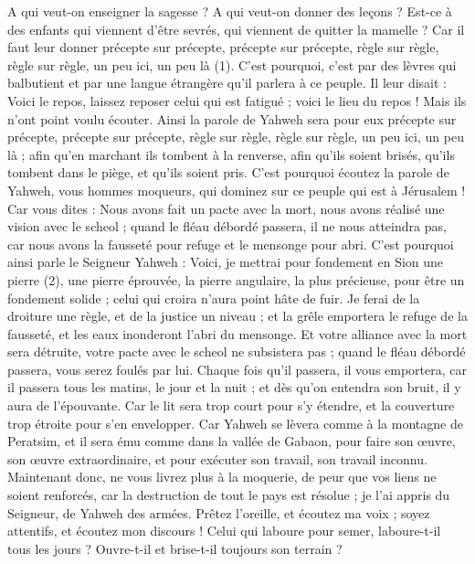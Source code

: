 \begin{multicols}{2}
A qui veut-on enseigner la sagesse ? A qui veut-on donner des leçons ? Est-ce à des enfants qui viennent d’être sevrés, qui viennent de quitter la mamelle ?
Car il faut leur donner précepte sur précepte, précepte sur précepte, règle sur règle, règle sur règle, un peu ici, un peu là (1).
C'est pourquoi, c’est par des lèvres qui balbutient et par une langue étrangère qu’il parlera à ce peuple.
Il leur disait : Voici le repos, laissez reposer celui qui est fatigué ; voici le lieu du repos ! Mais ils n'ont point voulu écouter.
Ainsi la parole de Yahweh sera pour eux précepte sur précepte, précepte sur précepte, règle sur règle, règle sur règle, un peu ici, un peu là ; afin qu’en marchant ils tombent à la renverse, afin qu'ils soient brisés, qu'ils tombent dans le piège, et qu'ils soient pris.
C'est pourquoi écoutez la parole de Yahweh, vous hommes moqueurs, qui dominez sur ce peuple qui est à Jérusalem !
Car vous dites : Nous avons fait un pacte avec la mort, nous avons réalisé une vision avec le scheol ; quand le fléau débordé passera, il ne nous atteindra pas, car nous avons la fausseté pour refuge et le mensonge pour abri.
C'est pourquoi ainsi parle le Seigneur Yahweh : Voici, je mettrai pour fondement en Sion une pierre (2), une pierre éprouvée, la pierre angulaire, la plus précieuse, pour être un fondement solide ; celui qui croira n’aura point hâte de fuir.
Je ferai de la droiture une règle, et de la justice un niveau ; et la grêle emportera le refuge de la fausseté, et les eaux inonderont l’abri du mensonge.
Et votre alliance avec la mort sera détruite, votre pacte avec le scheol ne subsistera pas ; quand le fléau débordé passera, vous serez foulés par lui.
Chaque fois qu'il passera, il vous emportera, car il passera tous les matins, le jour et la nuit ; et dès qu'on entendra son bruit, il y aura de l’épouvante.
Car le lit sera trop court pour s'y étendre, et la couverture trop étroite pour s’en envelopper.
Car Yahweh se lèvera comme à la montagne de Peratsim, et il sera ému comme dans la vallée de Gabaon, pour faire son œuvre, son œuvre extraordinaire, et pour exécuter son travail, son travail inconnu.
Maintenant donc, ne vous livrez plus à la moquerie, de peur que vos liens ne soient renforcés, car la destruction de tout le pays est résolue ; je l’ai appris du Seigneur, de Yahweh des armées.
Prêtez l'oreille, et écoutez ma voix ; soyez attentifs, et écoutez mon discours !
Celui qui laboure pour semer, laboure-t-il tous les jours ? Ouvre-t-il et brise-t-il toujours son terrain ?

\end{multicols}
